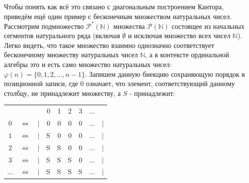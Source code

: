 \documentclass[12pt]{article}
\begin{document}
Чтобы понять как всё это связано с диагональным построением Кантора, приведём ещё один пример с бесконечным множеством натуральных чисел. Рассмотрим подмножество $\mathcal{P}^*(\mathbb{N})$ множества $\mathcal{P}(\mathbb{N})$ состоящее из начальных сегментов натурального ряда (включая $\emptyset$ и исключая множество всех чисел $\mathbb{N}$). Легко видеть, что такое множество взаимно однозначно соответствует бесконечному множеству натуральных чисел $\mathbb{N}$, а в контексте ординальной алгебры это и есть само множество натуральных чисел: $\varphi(n) = \{ 0, 1, 2, \dots, n - 1 \}$. Запишем данную биекцию сохраняющую порядок в позиционной записи, где $0$ означает, что элемент, соответствующий данному столбцу, не принадлежит множеству, а $S$ - принадлежит:
\begin{center}
\begin{tabular}{c c c r r r r r c} 
 & & & 0 & 1 & 2 & 3 & $\dots$ & \\
$0$ & $\Leftrightarrow$  & $|$ & 0 & 0 & 0 & 0 & $\dots$ & $|$\\
$1$ & $\Leftrightarrow$  & $|$ & S & 0 & 0 & 0 & $\dots$ & $|$\\
$2$ & $\Leftrightarrow$  & $|$ & S & S & 0 & 0 & $\dots$ & $|$\\
$3$ & $\Leftrightarrow$  & $|$ & S & S & S & 0 & $\dots$ & $|$\\
$\dots$ & $\Leftrightarrow$  & $|$ & S & S & S & S & $\dots$ & $|$
\label{constr:n-bijection}
\end{tabular}
\end{center}
\end{document}
